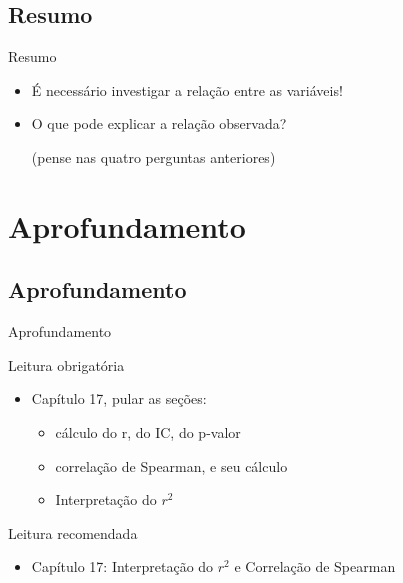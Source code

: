 \documentclass{beamer}
\begin{document}
\subsection{Resumo}

\begin{frame}{\scriptsize Resumo}
  \begin{itemize}
    \footnotesize
  \item É necessário investigar a relação entre as variáveis!
    \bigskip
    \bigskip
  \item O que pode explicar a relação observada?

    \tiny
    (pense nas quatro perguntas anteriores)
  \end{itemize}
\end{frame}

\section{Aprofundamento}

\subsection{Aprofundamento}

\begin{frame}{\scriptsize Aprofundamento}
  \begin{block}{Leitura obrigatória}
    \footnotesize
    \begin{itemize}
      \footnotesize
    \item Capítulo 17, pular as seções:
      \begin{itemize}
        \scriptsize
      \item cálculo do r, do IC, do p-valor
      \item correlação de Spearman, e seu cálculo
      \item Interpretação do $r^2$
      \end{itemize}
    \end{itemize}
  \end{block}
  \begin{block}{Leitura recomendada}
    \begin{itemize}
      \scriptsize
    \item Capítulo 17: Interpretação do $r^2$ e Correlação de Spearman
    \end{itemize}
  \end{block}
\end{frame}
\end{document}
